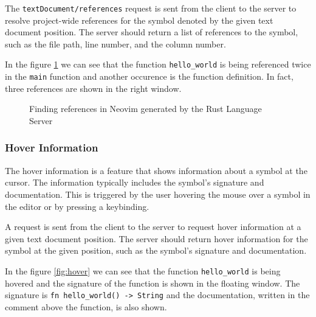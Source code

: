 The \texttt{textDocument/references} request is sent from the client to the server to resolve project-wide references for the symbol denoted by the given text document position. The server should return a list of references to the symbol, such as the file path, line number, and the column number.

In the figure \ref{fig:references} we can see that the function \texttt{hello\_world} is being referenced twice in the \texttt{main} function and another occurence is the function definition. In fact, three references are shown in the right window.

\begin{figure}[t]
    \centering
    \caption{Finding references in Neovim generated by the Rust Language Server}
    \label{fig:references}
\end{figure}

\subsubsection{Hover Information}\label{subsubsec:background:HoverInformation}

\hfill \break

The hover information is a feature that shows information about a symbol at the cursor. The information typically includes the symbol's signature and documentation. This is triggered by the user hovering the mouse over a symbol in the editor or by pressing a keybinding.

A request is sent from the client to the server to request hover information at a given text document position. The server should return hover information for the symbol at the given position, such as the symbol's signature and documentation.

In the figure \ref{fig:hover} we can see that the function \texttt{hello\_world} is being hovered and the signature of the function is shown in the floating window. The signature is \texttt{fn hello\_world() -> String} and the documentation, written in the comment above the function, is also shown.

